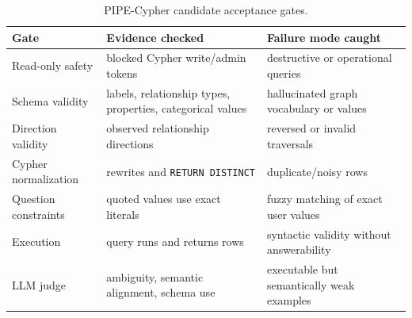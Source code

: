 \begin{table}[t]
\centering
\small
\begin{tabular}{lll}
\toprule
Gate & Evidence checked & Failure mode caught \\
\midrule
Read-only safety & blocked Cypher write/admin tokens & destructive or operational queries \\
Schema validity & labels, relationship types, properties, categorical values & hallucinated graph vocabulary or values \\
Direction validity & observed relationship directions & reversed or invalid traversals \\
Cypher normalization & rewrites and \texttt{RETURN DISTINCT} & duplicate/noisy rows \\
Question constraints & quoted values use exact literals & fuzzy matching of exact user values \\
Execution & query runs and returns rows & syntactic validity without answerability \\
LLM judge & ambiguity, semantic alignment, schema use & executable but semantically weak examples \\
\bottomrule
\end{tabular}
\caption{PIPE-Cypher candidate acceptance gates.}
\label{tab:gates}
\end{table}
